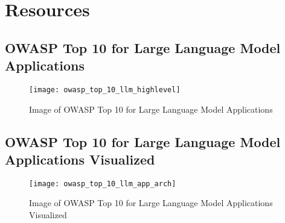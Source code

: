 

\headerimage
\chapter{Resources}

\section{OWASP Top 10 for Large Language Model Applications}

\begin{figure}[ht]
  \centering
  \texttt{[image: owasp\_top\_10\_llm\_highlevel]}
  \caption{Image of OWASP Top 10 for Large Language Model Applications}
  \label{fig:owasp-top-10-llm-highlevel}
\end{figure}

\clearpage
\section{OWASP Top 10 for Large Language Model Applications Visualized}

\begin{figure}[ht]
  \centering
  \texttt{[image: owasp\_top\_10\_llm\_app\_arch]}
  \caption{Image of OWASP Top 10 for Large Language Model Applications Visualized}
  \label{fig:owasp-top-10-llm-visualized}
\end{figure}




